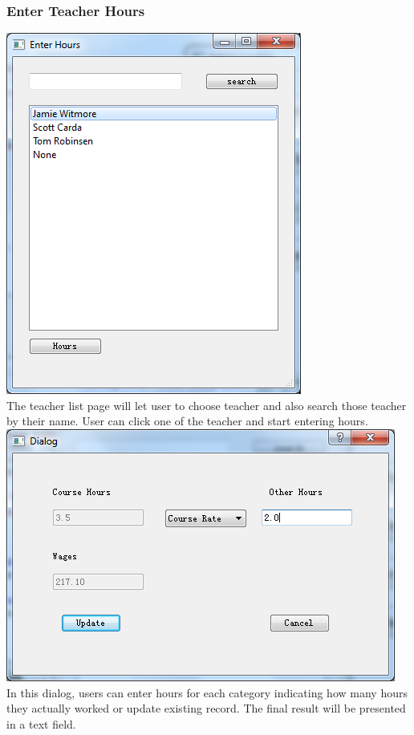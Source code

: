 \subsubsection{Enter Teacher Hours}
\includegraphics[scale=0.5]{pics/enter_hours_main.png}\\
The teacher list page will let user to choose teacher and also search those teacher by their name. User can click one of the teacher and start entering hours.\\
\includegraphics[scale=0.5]{pics/enter_hours_dialog.png}\\
In this dialog, users can enter hours for each category indicating how many hours they actually worked or update existing record. The final result will be presented in a text field.
 
